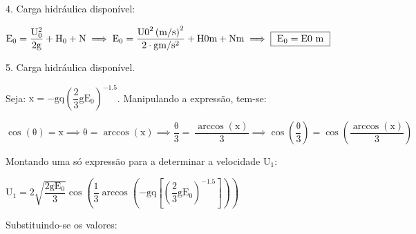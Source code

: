 \documentclass{article}
\newcommand{\myspace}{0.5cm}
\begin{document}
\vspace{\myspace}

4. Carga hidráulica disponível:

\vspace{\myspace}

\begin{center}
	$
		\mathrm
		{
			E_{0} = \dfrac{U_{0}^{2}}{2g} + H_{0} + N 
		} 
		\implies 
		\mathrm
		{
			E_{0} = \dfrac{ {{U0}}^{2} \left (m/s\right )^{2}}{2\cdot {{g}} m/s^{2} } + {{H0}}m + {{N}}m
		}
		\implies
		\fbox
		{ 
			$\mathrm
			{
				E_{0} = {{E0}} \ m
			}
			$
		} 
	$  
\end{center}

\vspace{\myspace}

5. Carga hidráulica disponível.\\

\vspace{\myspace}

Seja: $ \mathrm{x = -gq\left ( \dfrac{2}{3} gE_{0}\right )^{-1.5}}$. Manipulando a expressão, tem-se:

\vspace{\myspace}

\begin{center}
	$	
		\mathrm
		{
			\cos \! \left ( \theta \right ) =x 
			\implies  
			\theta=\arccos \! \left ( x \right ) 
			\implies 
			\dfrac{\theta}{3}=\ \dfrac{\arccos\left ( x \right )}{3} 
			\implies 
			\cos \! \left ( \dfrac{\theta}{3} \right ) = \cos \! \left ( \dfrac{\arccos \! \left( x \right )}{3} \right)
		}
	$
\end{center}

\vspace{\myspace}

Montando uma só expressão para a determinar a velocidade $\mathrm{U_{1}}$: 

\vspace{\myspace}

\begin{center}
	$	
		\mathrm
		{
			U_{1} = 2\sqrt{\dfrac{2gE_{0}}{3}}\cos \! \left (\dfrac{1}{3}\arccos \! \left( -gq\left [\left ( \dfrac{2}{3} gE_{0}\right )^{-1.5}  \right ] \right ) \right)
		}
	$
\end{center}

\vspace{\myspace}

Substituindo-se os valores:

\vspace{\myspace}
\end{document}
